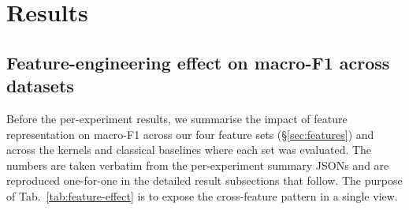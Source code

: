 \documentclass[pdflatex,sn-mathphys]{sn-jnl}
\theoremstyle{plain}
\theoremstyle{remark}
\theoremstyle{definition}
\begin{document}
\section{Results}\label{sec:results}

\subsection{Feature-engineering effect on macro-F1 across datasets}\label{sec:feature-effect}
Before the per-experiment results, we summarise the impact of feature representation on macro-F1 across our four feature sets (\S\ref{sec:features}) and across the kernels and classical baselines where each set was evaluated. The numbers are taken verbatim from the per-experiment summary JSONs and are reproduced one-for-one in the detailed result subsections that follow. The purpose of Tab.~\ref{tab:feature-effect} is to expose the cross-feature pattern in a single view.
\end{document}
